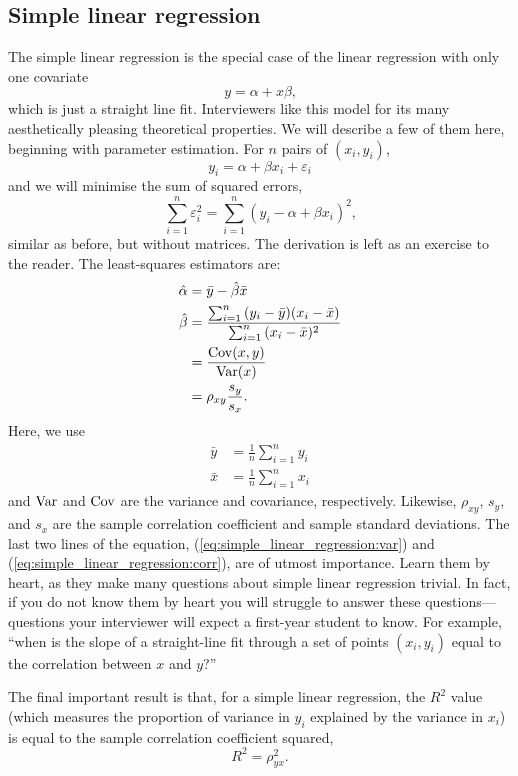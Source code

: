 \documentclass[a4paper]{article}
\begin{document}
\subsection{Simple linear regression}

The simple linear regression is the special case of the linear regression with only one covariate
\[
  y = \alpha + x \beta
  \text{,}
\]
which is just a straight line fit.
Interviewers like this model for its many aesthetically pleasing theoretical properties.
We will describe a few of them here, beginning with parameter estimation.
For $n$ pairs of $(x_i, y_i)$,
\[
  y_i = \alpha + \beta x_i + \varepsilon_i
\]
and we will minimise the sum of squared errors,
\[
\sum_{i=1}^{n}{  \varepsilon_i^2 }
  =
\sum_{i=1}^{n}{ (y_i -  \alpha + \beta x_i)^2 }
\text{,}
\]
similar as before, but without matrices.
The derivation is left as an exercise to the reader.
The least-squares estimators are:
\begin{align}
  \hat{\alpha} &= \bar{y} - \hat\beta \bar{x} \nonumber \\
  \hat{\beta} &=
  \frac
  {\sum_{i=1}^{n}{ (y_i - \bar{y}) (x_i - \bar{x}) }}
  {\sum_{i=1}^{n}{ (x_i - \bar{x})^2 }} \nonumber \\
  &=
  \frac
  {\operatorname{\mathrm{Cov}}(x, y)}
  {\operatorname{\mathrm{Var}}(x)} \label{eq:simple_linear_regression:var} \\
  &= \rho_{xy} \frac{s_y}{s_x} \label{eq:simple_linear_regression:corr}
  \text{.}
\end{align}
Here, we use
\begin{align*}
\bar{y} &= \frac{1}{n}\sum_{i=1}^{n}{y_i} \\
\bar{x} &= \frac{1}{n}\sum_{i=1}^{n}{x_i}
\end{align*}
and $\operatorname{\mathrm{Var}}$ and $\operatorname{\mathrm{Cov}}$ are the variance and covariance, respectively.
Likewise,
$\rho_{xy}$,
$s_y$, and
$s_x$ are the sample correlation coefficient and sample standard deviations.
The last two lines of the equation,
(\ref{eq:simple_linear_regression:var})
and
(\ref{eq:simple_linear_regression:corr}),
are of utmost importance.
Learn them by heart, as they make many questions about simple linear regression trivial.
In fact, if you do not know them by heart you will struggle to answer these questions---questions your interviewer will expect a first-year student to know.
For example, ``when is the slope of a straight-line fit through a set of points $(x_i,y_i)$ equal to the correlation between $x$ and $y$?''

The final important result is that, for a simple linear regression, the $R^2$ value (which measures the proportion of variance in $y_i$ explained by the variance in $x_i$) is equal to the sample correlation coefficient squared,
\[
  R^2 = \rho_{yx}^2
  \text{.}
\]
\end{document}
